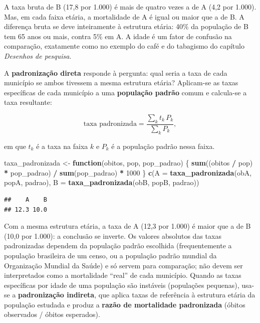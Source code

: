 \documentclass[
]{book}
\newenvironment{Shaded}{\begin{snugshade}}{\end{snugshade}}
\newcommand{\AttributeTok}[1]{\textcolor[rgb]{0.13,0.29,0.53}{#1}}
\newcommand{\ControlFlowTok}[1]{\textcolor[rgb]{0.13,0.29,0.53}{\textbf{#1}}}
\newcommand{\DecValTok}[1]{\textcolor[rgb]{0.00,0.00,0.81}{#1}}
\newcommand{\FunctionTok}[1]{\textcolor[rgb]{0.13,0.29,0.53}{\textbf{#1}}}
\newcommand{\NormalTok}[1]{#1}
\newcommand{\OtherTok}[1]{\textcolor[rgb]{0.56,0.35,0.01}{#1}}
\newcommand{\SpecialCharTok}[1]{\textcolor[rgb]{0.81,0.36,0.00}{\textbf{#1}}}
\begin{document}
A taxa bruta de B (17,8 por 1.000) é mais de quatro vezes a de A (4,2 por 1.000). Mas, em cada faixa etária, a mortalidade de A é igual ou maior que a de B. A diferença bruta se deve inteiramente à estrutura etária: 40\% da população de B tem 65 anos ou mais, contra 5\% em A. A idade é um fator de confusão na comparação, exatamente como no exemplo do café e do tabagismo do capítulo \emph{Desenhos de pesquisa}.

A \textbf{padronização direta} responde à pergunta: qual seria a taxa de cada município se ambos tivessem a mesma estrutura etária? Aplicam-se as taxas específicas de cada município a uma \textbf{população padrão} comum e calcula-se a taxa resultante:

\[
\text{taxa padronizada} = \frac{\sum_k t_k \, P_k}{\sum_k P_k},
\]

em que \(t_k\) é a taxa na faixa \(k\) e \(P_k\) é a população padrão nessa faixa.

\begin{Shaded}
\begin{Highlighting}[]
\NormalTok{taxa\_padronizada }\OtherTok{\textless{}{-}} \ControlFlowTok{function}\NormalTok{(obitos, pop, pop\_padrao) \{}
  \FunctionTok{sum}\NormalTok{((obitos }\SpecialCharTok{/}\NormalTok{ pop) }\SpecialCharTok{*}\NormalTok{ pop\_padrao) }\SpecialCharTok{/} \FunctionTok{sum}\NormalTok{(pop\_padrao) }\SpecialCharTok{*} \DecValTok{1000}
\NormalTok{\}}
\FunctionTok{c}\NormalTok{(}\AttributeTok{A =} \FunctionTok{taxa\_padronizada}\NormalTok{(obA, popA, padrao), }\AttributeTok{B =} \FunctionTok{taxa\_padronizada}\NormalTok{(obB, popB, padrao))}
\end{Highlighting}
\end{Shaded}

\begin{verbatim}
##    A    B 
## 12.3 10.0
\end{verbatim}

Com a mesma estrutura etária, a taxa de A (12,3 por 1.000) é maior que a de B (10,0 por 1.000): a conclusão se inverte. Os valores absolutos das taxas padronizadas dependem da população padrão escolhida (frequentemente a população brasileira de um censo, ou a população padrão mundial da Organização Mundial da Saúde) e só servem para comparação; não devem ser interpretados como a mortalidade ``real'' de cada município. Quando as taxas específicas por idade de uma população são instáveis (populações pequenas), usa-se a \textbf{padronização indireta}, que aplica taxas de referência à estrutura etária da população estudada e produz a \textbf{razão de mortalidade padronizada} (óbitos observados / óbitos esperados).
\end{document}
